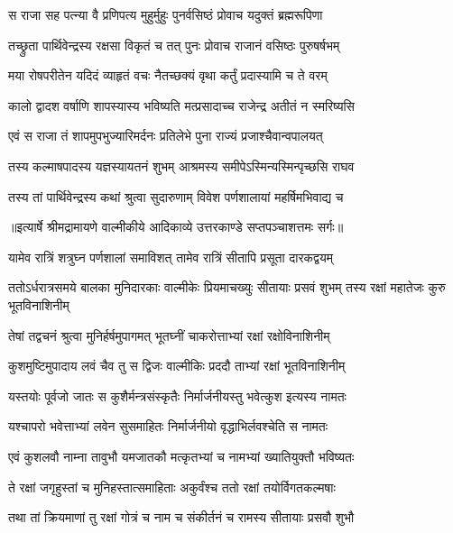 \twolineshloka
{स राजा सह पत्न्या वै प्रणिपत्य मुहुर्मुहुः}
{पुनर्वसिष्ठं प्रोवाच यदुक्तं ब्रह्मरूपिणा} %

\twolineshloka
{तच्छ्रुता पार्थिवेन्द्रस्य रक्षसा विकृतं च तत्}
{पुनः प्रोवाच राजानं वसिष्ठः पुरुषर्षभम्} %

\twolineshloka
{मया रोषपरीतेन यदिदं व्याहृतं वचः}
{नैतच्छक्यं वृथा कर्तुं प्रदास्यामि च ते वरम्} %

\twolineshloka
{कालो द्वादश वर्षाणि शापस्यास्य भविष्यति}
{मत्प्रसादाच्च राजेन्द्र अतीतं न स्मरिष्यसि} %

\twolineshloka
{एवं स राजा तं शापमुपभुज्यारिमर्दनः}
{प्रतिलेभे पुना राज्यं प्रजाश्चैवान्वपालयत्} %

\twolineshloka
{तस्य कल्माषपादस्य यज्ञस्यायतनं शुभम्}
{आश्रमस्य समीपेऽस्मिन्यस्मिन्पृच्छसि राघव} %

\twolineshloka
{तस्य तां पार्थिवेन्द्रस्य कथां श्रुत्वा सुदारुणाम्}
{विवेश पर्णशालायां महर्षिमभिवाद्य च} %


{॥इत्यार्षे श्रीमद्रामायणे वाल्मीकीये आदिकाव्ये उत्तरकाण्डे सप्तपञ्चाशत्तमः सर्गः॥}


\twolineshloka
{यामेव रात्रिं शत्रुघ्न पर्णशालां समाविशत्}
{तामेव रात्रिं सीतापि प्रसूता दारकद्वयम्} %

\threelineshloka
{ततोऽर्धरात्रसमये बालका मुनिदारकाः}
{वाल्मीकेः प्रियमाचख्युः सीतायाः प्रसवं शुभम्}
{तस्य रक्षां महातेजः कुरु भूतविनाशिनीम्} %

\twolineshloka
{तेषां तद्वचनं श्रुत्वा मुनिर्हर्षमुपागमत्}
{भूतघ्नीं चाकरोत्ताभ्यां रक्षां रक्षोविनाशिनीम्} %

\twolineshloka
{कुशमुष्टिमुपादाय लवं चैव तु स द्विजः}
{वाल्मीकिः प्रददौ ताभ्यां रक्षां भूतविनाशिनीम्} %

\twolineshloka
{यस्तयोः पूर्वजो जातः स कुशैर्मन्त्रसंस्कृतैः}
{निर्मार्जनीयस्तु भवेत्कुश इत्यस्य नामतः} %

\twolineshloka
{यश्चापरो भवेत्ताभ्यां लवेन सुसमाहितः}
{निर्मार्जनीयो वृद्धाभिर्लवश्चेति स नामतः} %

\twolineshloka
{एवं कुशलवौ नाम्ना तावुभौ यमजातकौ}
{मत्कृतभ्यां च नामभ्यां ख्यातियुक्तौ भविष्यतः} %

\twolineshloka
{ते रक्षां जगृहुस्तां च मुनिहस्तात्समाहिताः}
{अकुर्वंश्च ततो रक्षां तयोर्विगतकल्मषाः} %

\twolineshloka
{तथा तां क्रियमाणां तु रक्षां गोत्रं च नाम च}
{संकीर्तनं च रामस्य सीतायाः प्रसवौ शुभौ} %

